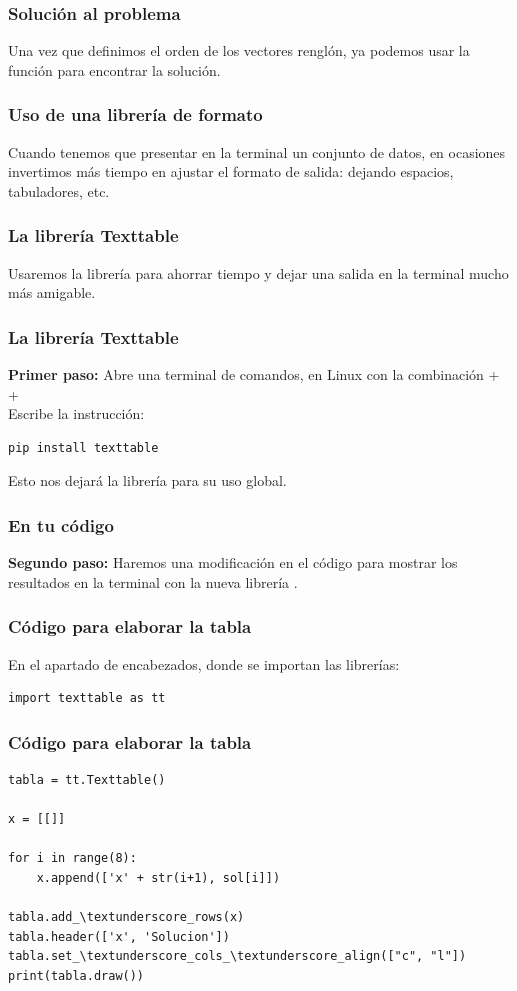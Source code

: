 \begin{frame}
\frametitle{Solución al problema}
Una vez que definimos el orden de los vectores renglón, ya podemos usar la función  para encontrar la solución.
\end{frame}
\begin{frame}
\frametitle{Uso de una librería de formato}
Cuando tenemos que presentar en la terminal un conjunto de datos, en ocasiones invertimos más tiempo en ajustar el formato de salida: dejando espacios, tabuladores, etc.   
\end{frame}
\begin{frame}
\frametitle{La librería Texttable}
Usaremos la librería  para ahorrar tiempo y dejar una salida en la terminal mucho más amigable.
\end{frame}
\begin{frame}[fragile]
\frametitle{La librería Texttable}
\textbf{Primer paso:} Abre una terminal de comandos, en Linux con la combinación  +  + 
\\
\bigskip
Escribe la instrucción:
\begin{verbatim}    
pip install texttable
\end{verbatim}
\pause
Esto nos dejará la librería para su uso global.
\end{frame}
\begin{frame}
\frametitle{En tu código}
\textbf{Segundo paso: } Haremos una modificación en el código para mostrar los resultados en la terminal con la nueva librería .
\end{frame}
\begin{frame}[fragile]
\frametitle{Código para elaborar la tabla}
En el apartado de encabezados, donde se importan las librerías:
\begin{lstlisting}[caption=Importando la librería Texttable, style=FormattedNumber, basicstyle=\linespread{1.1}\ttfamily=\small, columns=fullflexible]
import texttable as tt
\end{lstlisting}
\end{frame}
\begin{frame}
\frametitle{Código para elaborar la tabla}
\begin{lstlisting}[caption=Creando el objeto y definiendo propiedades, style=FormattedNumber, basicstyle=\linespread{1.1}\ttfamily=\small, columns=fullflexible]
tabla = tt.Texttable()

x = [[]]

for i in range(8):
    x.append(['x' + str(i+1), sol[i]])

tabla.add_\textunderscore_rows(x)
tabla.header(['x', 'Solucion'])
tabla.set_\textunderscore_cols_\textunderscore_align(["c", "l"])
print(tabla.draw())
\end{lstlisting}    
\end{frame}
